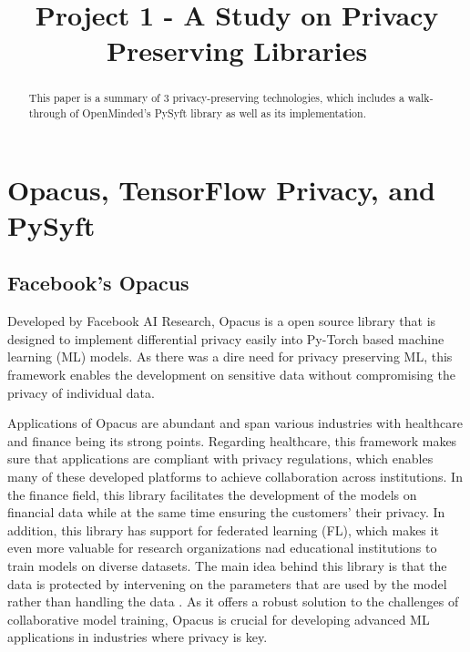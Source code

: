 \documentclass[conference]{IEEEtran}
\begin{document}
\title{Project 1 - A Study on Privacy Preserving Libraries\\
}

\author{
}

\maketitle

\begin{abstract}
This paper is a summary of 3 privacy-preserving technologies, which includes a
walk-through of OpenMinded's PySyft library as well as its implementation.
\end{abstract}

\section{Opacus, TensorFlow Privacy, and PySyft}

\subsection{Facebook's Opacus}

Developed by Facebook AI Research, Opacus is a open source library that is
designed to implement differential privacy easily into Py-Torch based machine
learning (ML) models. As there was a dire need for privacy preserving ML, this
framework enables the development on sensitive data without compromising the
privacy of individual data.

Applications of Opacus are abundant and span various industries with healthcare
and finance being its strong points. Regarding healthcare, this framework makes
sure that applications are compliant with privacy regulations, which enables
many of these developed platforms to achieve collaboration across institutions.
In the finance field, this library facilitates the development of the models on
financial data while at the same time ensuring the customers' their privacy. In
addition, this library has support for federated learning (FL), which makes it
even more valuable for research organizations nad educational institutions to
train models on diverse datasets. The main idea behind this library is that 
the data is protected by intervening on the parameters that are used by the 
model rather than handling the data \cite{b1}. As it offers a robust solution 
to the challenges of collaborative model training, Opacus is crucial for 
developing advanced ML applications in industries where privacy is key. 
\end{document}
